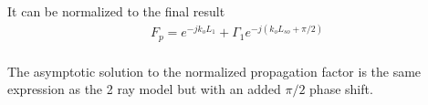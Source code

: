 \noindent It can be normalized to the final result
\begin{equation}
\begin{gathered}
\boxed{F_p= e^{-jk_oL_1} + \Gamma_1e^{-j\left(k_oL_{so}+\pi/2\right)}} \\
\end{gathered}
\label{mp_eq:28}
\end{equation}
\renewcommand{\baselinestretch}{2} \small\normalsize

The asymptotic solution to the normalized propagation factor is the same expression as the 2 ray model but with an added $\pi/2$ phase shift.